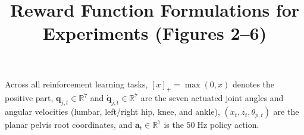 \documentclass[11pt]{article}
\title{Reward Function Formulations for Experiments (Figures 2--6)}
\date{}
\begin{document}
\maketitle

\noindent Across all reinforcement learning tasks, $[x]_+ = \max(0, x)$ denotes the positive part, $\mathbf{q}_{j,t} \in \mathbb{R}^7$ and $\dot{\mathbf{q}}_{j,t} \in \mathbb{R}^7$ are the seven actuated joint angles and angular velocities (lumbar, left/right hip, knee, and ankle), $(x_t, z_t, \theta_{p,t})$ are the planar pelvis root coordinates, and $\mathbf{a}_t \in \mathbb{R}^7$ is the $50\;\mathrm{Hz}$ policy action.






\end{document}
